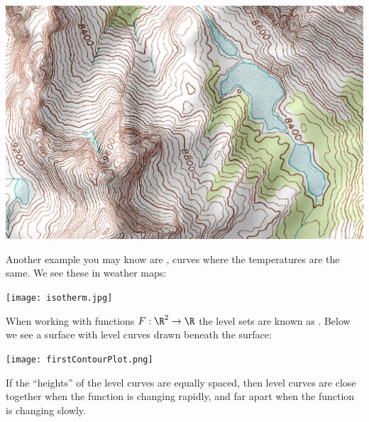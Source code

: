\documentclass{ximera}
\begin{document}
\begin{image}%
  \includegraphics{topomap.jpg}
\end{image}

Another example you may know are , curves where the
temperatures are the same. We see these in weather maps:

\begin{image}
  \texttt{[image: isotherm.jpg]}
\end{image}

When working with functions $F:\R^2\to\R$ the level sets are known as
.  Below we see a surface with level curves drawn
beneath the surface:

\begin{image}
  \texttt{[image: firstContourPlot.png]}
\end{image}

If the ``heights'' of the level curves are equally spaced, then level
curves are close together when the function is changing rapidly, and
far apart when the function is changing slowly.
\end{document}
